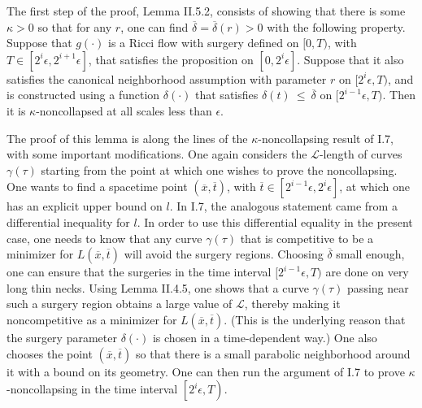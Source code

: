 \documentclass[12pt]{amsart}
\numberwithin{equation}{section}
\theoremstyle{plain}
\theoremstyle{definition}
\theoremstyle{remark}
\begin{document}
The first step of the proof, Lemma II.5.2, consists of showing
that there is some $\kappa > 0$ so that for any $r$, one can
find $\overline{\delta} = \overline{\delta}(r) > 0$ with the following
property. Suppose that $g(\cdot)$ is a Ricci flow
with surgery defined on $[0, T)$, with $T \in [2^i \epsilon, 2^{i+1} \epsilon]$,
that satisfies the proposition on $[0, 2^i \epsilon]$.
Suppose that it also satisfies the canonical neighborhood assumption with
parameter $r$ on $[2^i \epsilon, T)$, and is constructed using a function
$\delta(\cdot)$ that satisfies $\delta(t) \: \le \: \overline{\delta}$ on
$[2^{i-1} \epsilon, T)$. Then it is 
$\kappa$-noncollapsed at all scales less than $\epsilon$. 

The proof of this
lemma is along the lines of the $\kappa$-noncollapsing result of I.7, with
some important modifications.  One again considers the ${\mathcal L}$-length of curves
$\gamma(\tau)$ starting from the point at which one wishes to prove the
noncollapsing. One wants to find a spacetime point
$(\overline{x}, \overline{t})$, with
$\overline{t} \in [2^{i-1} \epsilon, 2^i \epsilon]$, at which one has
an explicit upper bound on $l$. In I.7, the analogous statement came from
a differential inequality for $l$. In order to use this differential
equality in the present case, one needs to know that any curve $\gamma(\tau)$ 
that is competitive to be a minimizer for $L(\overline{x}, \overline{t})$ 
will avoid the surgery regions.
Choosing $\overline{\delta}$ small enough, one can ensure that the
surgeries in the time interval $[2^{i-1} \epsilon, T)$ are done on very
long thin necks. Using Lemma II.4.5, one shows that a curve $\gamma(\tau)$
passing near such a surgery region obtains a large value of ${\mathcal L}$,
thereby making it noncompetitive as a minimizer for 
$L(\overline{x}, \overline{t})$. (This is the underlying
reason that the surgery parameter
$\delta(\cdot)$ is chosen in a time-dependent way.)
One also chooses the point
$(\overline{x}, \overline{t})$ so that there is a small parabolic neighborhood
around it with a bound on its geometry. One can then run the argument of
I.7 to prove $\kappa$-noncollapsing in the time interval
$\left[ 2^i \epsilon, T \right)$.
\end{document}
